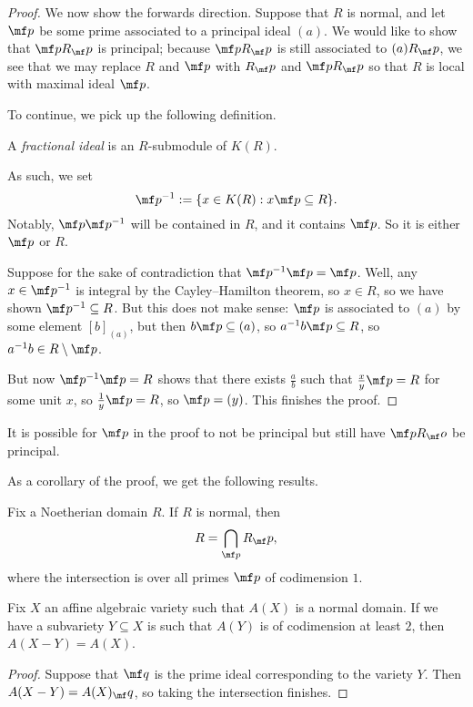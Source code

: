 \begin{proof}
	We now show the forwards direction. Suppose that $R$ is normal, and let $\mf p$ be some prime associated to a principal ideal $(a)$. We would like to show that $\mf pR_\mf p$ is principal; because $\mf pR_\mf p$ is still associated to $(a)R_\mf p$, we see that we may replace $R$ and $\mf p$ with $R_\mf p$ and $\mf pR_\mf p$ so that $R$ is local with maximal ideal $\mf p$.

	To continue, we pick up the following definition.
	\begin{definition}
		A \textit{fractional ideal} is an $R$-submodule of $K(R)$.
	\end{definition}
	As such, we set
	\[\mf p^{-1}:=\{x\in K(R):x\mf p\subseteq R\}.\]
	Notably, $\mf p\mf p^{-1}$ will be contained in $R$, and it contains $\mf p$. So it is either $\mf p$ or $R$.

	Suppose for the sake of contradiction that $\mf p^{-1}\mf p=\mf p$. Well, any $x\in\mf p^{-1}$ is integral by the Cayley--Hamilton theorem, so $x\in R$, so we have shown $\mf p^{-1}\subseteq R$. But this does not make sense: $\mf p$ is associated to $(a)$ by some element $[b]_{(a)}$, but then $b\mf p\subseteq(a)$, so $a^{-1}b\mf p\subseteq R$, so $a^{-1}b\in R\setminus\mf p$.

	But now $\mf p^{-1}\mf p=R$ shows that there exists $\frac ab$ such that $\frac xy\mf p=R$ for some unit $x$, so $\frac1y\mf p=R$, so $\mf p=(y)$. This finishes the proof.
\end{proof}
\begin{remark}
	It is possible for $\mf p$ in the proof to not be principal but still have $\mf pR_\mf o$ be principal.
\end{remark}
As a corollary of the proof, we get the following results.
\begin{corollary}
	Fix a Noetherian domain $R$. If $R$ is normal, then
	\[R=\bigcap_{\mf p}R_\mf p,\]
	where the intersection is over all primes $\mf p$ of codimension $1$.
\end{corollary}
\begin{corollary}
	Fix $X$ an affine algebraic variety such that $A(X)$ is a normal domain. If we have a subvariety $Y\subseteq X$ is such that $A(Y)$ is of codimension at least $2$, then $A(X-Y)=A(X)$.
\end{corollary}
\begin{proof}
	Suppose that $\mf q$ is the prime ideal corresponding to the variety $Y$. Then $A(X-Y)=A(X)_\mf q$, so taking the intersection finishes. %
\end{proof}

